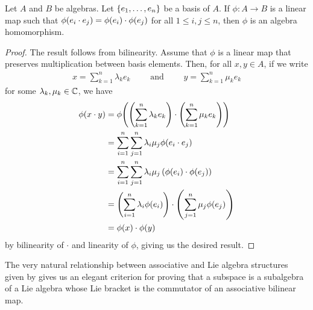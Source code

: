 \begin{boxlemma}\label{Ch1:Lemma:Basis_Hom_Alg_Hom}
    Let $A$ and $B$ be algebras. Let $\left\{ e_1, \ldots, e_n \right\}$ be a basis of $A$. If $\phi : A \to B$ is a linear map such that $\phi\!\left( e_i \cdot e_j \right) = \phi\!\left( e_i \right) \cdot \phi\!\left( e_j \right)$ for all $1 \leq i, j \leq n$, then $\phi$ is an algebra homomorphism.
\end{boxlemma}
\begin{proof}
    The result follows from bilinearity. Assume that $\phi$ is a linear map that preserves multiplication between basis elements. Then, for all $x, y \in A$, if we write
    \begin{align*}
        x = \sum_{k=1}^{n} \lambda_k e_k \qquad \text{ and } \qquad y = \sum_{k=1}^{n} \mu_k e_k
    \end{align*}
    for some $\lambda_k, \mu_k \in \mathbb{C}$, we have
    \begin{align*}
        \phiof{x \cdot y}
        &= \phiof{\parenth{\sum_{k=1}^{n} \lambda_k e_k} \cdot \parenth{\sum_{k=1}^{n} \mu_k e_k}} \\
        &= \sum_{i=1}^{n} \sum_{j=1}^{n} \lambda_i \mu_j \phiof{e_i \cdot e_j} \\
        &= \sum_{i=1}^{n} \sum_{j=1}^{n} \lambda_i \mu_j \parenth{\phiof{e_i} \cdot \phiof{e_j}} \\
        &= \parenth{\sum_{i=1}^{n} \lambda_i \phiof{e_i}} \cdot \parenth{\sum_{j=1}^{n} \mu_j \phiof{e_j}} \\
        &= \phiof{x} \cdot \phiof{y}
    \end{align*}
    by bilinearity of $\cdot$ and linearity of $\phi$, giving us the desired result.
\end{proof}

The very natural relationship between associative and Lie algebra structures given by  gives us an elegant criterion for proving that a subspace is a subalgebra of a Lie algebra whose Lie bracket is the commutator of an associative bilinear map.

